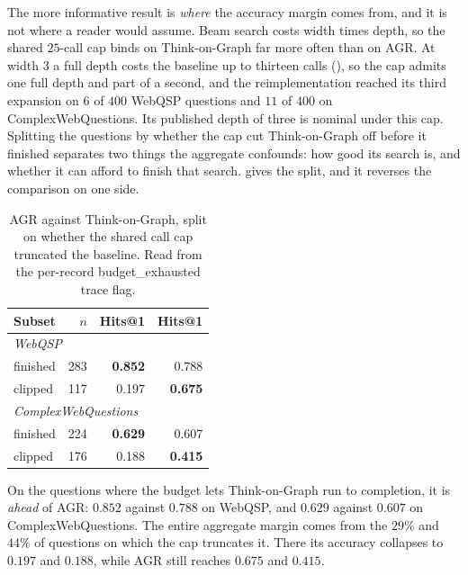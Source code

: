 The more informative result is \emph{where} the accuracy margin comes
from, and it is not where a reader would assume. Beam search costs width
times depth, so the shared $25$-call cap binds on Think-on-Graph far
more often than on AGR. At width $3$ a full depth costs the baseline up
to thirteen calls (), so the cap admits one full
depth and part of a second, and the reimplementation reached its third
expansion on $6$ of $400$ WebQSP questions and $11$ of $400$ on
ComplexWebQuestions. Its published depth of three is nominal under this
cap. Splitting the questions by whether the cap cut Think-on-Graph off
before it finished separates two things the aggregate confounds: how
good its search is, and whether it can afford to finish that search.
 gives the split, and it reverses the comparison on
one side.

\begin{table}[!tb]
  \begin{center}
    \caption{AGR against Think-on-Graph, split on whether the shared
      call cap truncated the baseline. Read from the per-record
      \textsf{budget\_exhausted} trace flag.}
    \label{tab:togsplit}
    \footnotesize
    \begin{tabular}{|l|r|rr|}
      \hline
      \textbf{Subset} & \textbf{$n$} & \textbf{\tog{} Hits@1}
        & \textbf{\agr{} Hits@1} \\
      \hline
      \multicolumn{4}{|l|}{\textit{WebQSP}} \\
      \tog{} finished & 283 & \textbf{0.852} & 0.788 \\
      \tog{} clipped  & 117 & 0.197 & \textbf{0.675} \\
      \hline
      \multicolumn{4}{|l|}{\textit{ComplexWebQuestions}} \\
      \tog{} finished & 224 & \textbf{0.629} & 0.607 \\
      \tog{} clipped  & 176 & 0.188 & \textbf{0.415} \\
      \hline
    \end{tabular}
  \end{center}
\end{table}

On the questions where the budget lets Think-on-Graph run to completion,
it is \emph{ahead} of AGR: $0.852$ against $0.788$ on WebQSP, and
$0.629$ against $0.607$ on ComplexWebQuestions. The entire aggregate
margin comes from the $29\%$ and $44\%$ of questions on which the cap
truncates it. There its accuracy collapses to $0.197$ and $0.188$, while
AGR still reaches $0.675$ and $0.415$.

